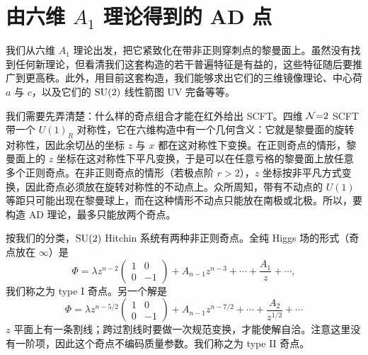 \section{由六维 $A_1$ 理论得到的 AD 点}
\label{sec:a1}

我们从六维 $A_1$ 理论出发，把它紧致化在带非正则穿刺点的黎曼面上。虽然没有找到任何新理论，但看清我们这套构造的若干普遍特征是有益的，这些特征随后要推广到更高秩。此外，用目前这套构造，我们能够求出它们的三维镜像理论、中心荷 $a$ 与 $c$，以及它们的 $\operatorname{SU}(2)$ 线性箭图 UV 完备等等。

我们需要先弄清楚：什么样的奇点组合才能在红外给出 SCFT。四维 $\mathcal{N}{=}2$ SCFT 带一个 $U(1)_R$ 对称性，它在六维构造中有一个几何含义：它就是黎曼面的旋转对称性，因此余切丛的坐标 $z$ 与 $x$ 都在这对称性下变换。在正则奇点的情形，黎曼面上的 $z$ 坐标在这对称性下平凡变换，于是可以在任意亏格的黎曼面上放任意多个正则奇点。在非正则奇点的情形（若极点阶 $r>2$），$z$ 坐标按非平凡方式变换，因此奇点必须放在旋转对称性的不动点上。众所周知，带有不动点的 $U(1)$ 等距只可能出现在黎曼球上，而在这种情形不动点只能放在南极或北极。所以，要构造 AD 理论，最多只能放两个奇点。

按我们的分类，$\operatorname{SU}(2)$ Hitchin 系统有两种非正则奇点。全纯 Higgs 场的形式（奇点放在 $\infty$）是
\begin{equation}
\Phi = \lambda z^{n-2}\begin{pmatrix} 1 & 0\\ 0 & -1\end{pmatrix}
+ A_{n-1}z^{n-3} + \cdots + \frac{A_1}{z} + \cdots,
\label{eq:4.1}\tag{4.1}
\end{equation}
我们称之为 type I 奇点。另一个解是
\begin{equation}
\Phi = \lambda z^{n-5/2}\begin{pmatrix} 1 & 0\\ 0 & -1\end{pmatrix}
+ A_{n-1}z^{n-7/2} + \cdots + \frac{A_2}{z^{1/2}} + \cdots
\label{eq:4.2}\tag{4.2}
\end{equation}
$z$ 平面上有一条割线；跨过割线时要做一次规范变换，才能使解自洽。注意这里没有一阶项，因此这个奇点不编码质量参数。我们称之为 type II 奇点。

